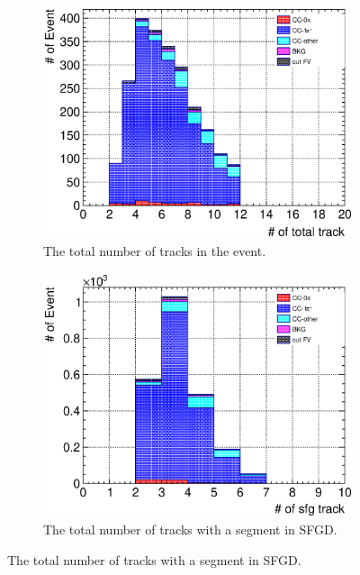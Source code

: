 \begin{figure}
  \centering
  \begin{subfigure}{\dbfigwid\textwidth}
       \includegraphics[width=\textwidth]{figures/sel/TPCmu_ntotaltrk_stack_al9.eps}
       \caption{The total number of tracks in the event.}
       \label{subfig:tlpi-trknum-tot-cut}
  \end{subfigure}
  \begin{subfigure}{\dbfigwid\textwidth}
       \includegraphics[width=\textwidth]{figures/sel/TPCmu_nsfgtrk_stack_al9.eps}
       \caption{The total number of tracks with a segment in SFGD.}
       \label{subfig:tlpi-trknum-sfgd-cut}
  \end{subfigure}

\end{figure}
